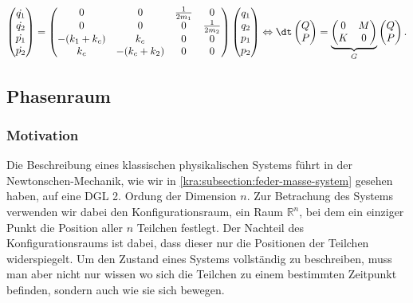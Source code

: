 \begin{equation}
    \label{kra:equation:hamilton-multispringmass}
    \begin{pmatrix}
        \dot{q_1} \\
        \dot{q_2} \\
        \dot{p_1} \\
        \dot{p_2} \\
    \end{pmatrix}
    =
    \begin{pmatrix}
        0            & 0            & \frac{1}{2m_1} & 0              \\
        0            & 0            & 0              & \frac{1}{2m_2} \\
        -(k_1 + k_c) & k_c          & 0              & 0              \\
        k_c          & -(k_c + k_2) & 0              & 0              \\
    \end{pmatrix}
    \begin{pmatrix}
        q_1 \\
        q_2 \\
        p_1 \\
        p_2 \\
    \end{pmatrix}
    \Leftrightarrow
    \dt
    \begin{pmatrix}
        Q \\
        P \\
    \end{pmatrix}
    =
    \underbrace{
        \begin{pmatrix}
            0 & M \\
            K & 0
        \end{pmatrix}
    }_{G}
    \begin{pmatrix}
        Q \\
        P \\
    \end{pmatrix}.
\end{equation}

\subsection{Phasenraum}
\subsubsection{Motivation}
Die Beschreibung eines klassischen physikalischen Systems führt in der Newtonschen-Mechanik, wie wir in \ref{kra:subsection:feder-masse-system} gesehen haben, auf eine DGL 2. Ordung der Dimension $n$.
Zur Betrachung des Systems verwenden wir dabei den Konfigurationsraum, ein Raum $\mathbb{R}^n$, bei dem ein einziger Punkt die Position aller $n$ Teilchen festlegt.
Der Nachteil des Konfigurationsraums ist dabei, dass dieser nur die Positionen der Teilchen widerspiegelt.
Um den Zustand eines Systems vollständig zu beschreiben, muss man aber nicht nur wissen wo sich die Teilchen zu einem bestimmten Zeitpunkt befinden, sondern auch wie sie sich bewegen.

